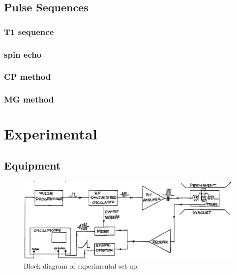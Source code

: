 \documentclass[
reprint,
amsmath,amssymb,
aps,
tikz,
border=5pt
]{revtex4-1}
\begin{document}
\subsection*{Pulse Sequences}

\subsubsection*{T1 sequence}

\subsubsection*{spin echo}

\subsubsection*{CP method}

\subsubsection*{MG method}


\section*{Experimental }

\subsection*{Equipment}

    \begin{figure}[h]
      \includegraphics[width=0.4 \textwidth]{figures/block_diagram.png}
      \caption{Block diagram of experimental set up.}
      \label{fig:block}
    \end{figure}
\end{document}
